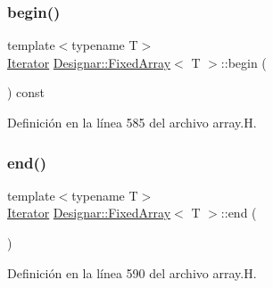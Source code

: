 \mbox{\label{class_designar_1_1_fixed_array_afeedbafa8456c56f80716466191810d6}} 
\subsubsection{\texorpdfstring{begin()}{begin()}\hspace{0.1cm}{\footnotesize\ttfamily [2/2]}}
{\footnotesize\ttfamily template$<$typename T$>$ \\
\hyperlink{class_designar_1_1_fixed_array_1_1_iterator}{Iterator} \hyperlink{class_designar_1_1_fixed_array}{Designar\+::\+Fixed\+Array}$<$ T $>$\+::begin (\begin{DoxyParamCaption}{ }\end{DoxyParamCaption}) const\hspace{0.3cm}{\ttfamily [inline]}}



Definición en la línea 585 del archivo array.\+H.

\mbox{\label{class_designar_1_1_fixed_array_ab0baaf67153a51cb98ac12918d2387a0}} 
\subsubsection{\texorpdfstring{end()}{end()}\hspace{0.1cm}{\footnotesize\ttfamily [1/2]}}
{\footnotesize\ttfamily template$<$typename T$>$ \\
\hyperlink{class_designar_1_1_fixed_array_1_1_iterator}{Iterator} \hyperlink{class_designar_1_1_fixed_array}{Designar\+::\+Fixed\+Array}$<$ T $>$\+::end (\begin{DoxyParamCaption}{ }\end{DoxyParamCaption})\hspace{0.3cm}{\ttfamily [inline]}}



Definición en la línea 590 del archivo array.\+H.

\mbox{\label{class_designar_1_1_fixed_array_a02b4949630ddc32ba5971fd4b78cf8ab}} 
